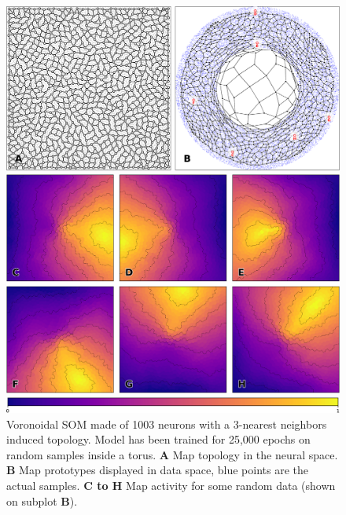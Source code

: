 \begin{figure}
  \includegraphics[width=\columnwidth]{figures/vsom-spatial-1.pdf}

  \vspace{2mm}
  
  \includegraphics[width=\columnwidth]{figures/vsom-spatial-2.pdf}

  \vspace{2mm}

  \includegraphics[width=\columnwidth]{figures/colormap.pdf}
  \caption{Voronoidal SOM made of 1003 neurons with a 3-nearest neighbors
    induced topology. Model has been trained for 25,000 epochs on random
    samples inside a torus. \textbf{A} Map topology in the neural
    space. \textbf{B} Map prototypes displayed in data space, blue points are
    the actual samples. \textbf{C to H} Map activity for some random data
    (shown on subplot \textbf{B}).}
    \label{fig:annulus}
\end{figure}


